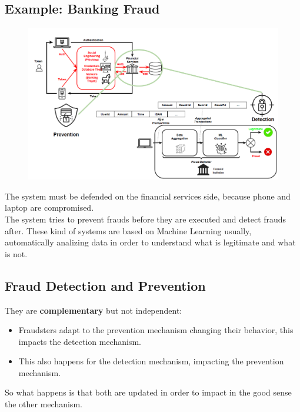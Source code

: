     \subsection{Example: Banking Fraud}
        \begin{figure}[!ht]
            \centering
            \includegraphics[width=0.45\linewidth]{bank_example.png}
        \end{figure}
        The system must be defended on the financial services side, because phone and laptop are compromised.\\ 
        The system tries to prevent frauds before they are executed and detect frauds after. These kind of systems are based on Machine Learning usually, automatically analizing data in order to understand what is legitimate and what is not.
    \subsection{Fraud Detection and Prevention}
        They are \textbf{complementary} but not independent:
        \begin{itemize}
            \item Fraudsters adapt to the prevention mechanism changing their behavior, this impacts the detection mechanism.
            \item This also happens for the detection mechanism, impacting the prevention mechanism.
        \end{itemize}
        So what happens is that both are updated in order to impact in the good sense the other mechanism.
\newpage
